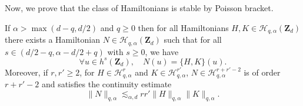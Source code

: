 Now, we prove that the class of Hamiltonians is stable by Poisson bracket.
\begin{proposition}
\label{prop_stable_Poisson}
If $\alpha>\max(d-q,d/2)$ and $q\geq 0$ then for all Hamiltonians $H,K \in \mathscr{H}_{q,\alpha}(\mathbf{Z}_d)$ there exists a Hamiltonian $N \in \mathscr{H}_{q,\alpha}(\mathbf{Z}_d)$ such that for all $s\in (d/2-q, \alpha-d/2+q)$ with $s\geq 0$, we have
\[
\forall u \in h^s(\mathbf{Z}_d), \quad N(u) = \{ H,K\}(u).
\]
Moreover, if $r,r'\geq 2$, for $H\in \mathscr{H}_{q,\alpha}^r$ and $K\in \mathscr{H}_{q,\alpha}^{r'}$, $N \in \mathscr{H}_{q,\alpha}^{r+r'-2}$ is of order $r+r'-2$ and satisfies the continuity estimate
\begin{equation}
\label{eq_cont_est_Poisson}
\| N\|_{q,\alpha} \lesssim_{\alpha,d} r r' \| H \|_{q,\alpha} \| K \|_{q,\alpha}.
\end{equation}
\end{proposition}

